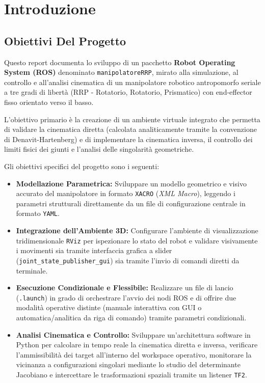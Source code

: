 \documentclass[11pt, a4paper]{report}
\begin{document}
\restoregeometry

\tableofcontents
\cleardoublepage


\chapter{Introduzione}
\section{Obiettivi Del Progetto}
Questo report documenta lo sviluppo di un pacchetto \textbf{Robot Operating System (ROS)} denominato \texttt{manipolatoreRRP}, mirato alla simulazione, al controllo e all'analisi cinematica di un manipolatore robotico antropomorfo seriale a tre gradi di libertà (RRP - Rotatorio, Rotatorio, Prismatico) con end-effector fisso orientato verso il basso.

L'obiettivo primario è la creazione di un ambiente virtuale integrato che permetta di validare la cinematica diretta (calcolata analiticamente tramite la convenzione di Denavit-Hartenberg) e di implementare la cinematica inversa, il controllo dei limiti fisici dei giunti e l'analisi delle singolarità geometriche.

Gli obiettivi specifici del progetto sono i seguenti:
\begin{itemize}
    \item \textbf{Modellazione Parametrica:} Sviluppare un modello geometrico e visivo accurato del manipolatore in formato \texttt{XACRO} (\textit{XML Macro}), leggendo i parametri strutturali direttamente da un file di configurazione centrale in formato \texttt{YAML}.

    \item \textbf{Integrazione dell'Ambiente 3D:} Configurare l'ambiente di visualizzazione tridimensionale \texttt{RViz} per ispezionare lo stato del robot e validare visivamente i movimenti sia tramite interfaccia grafica a slider (\texttt{joint\_state\_publisher\_gui}) sia tramite l'invio di comandi diretti da terminale.

    \item \textbf{Esecuzione Condizionale e Flessibile:} Realizzare un file di lancio (\texttt{.launch}) in grado di orchestrare l'avvio dei nodi ROS e di offrire due modalità operative distinte (manuale interattiva con GUI o automatica/analitica da riga di comando) tramite parametri condizionali.

    \item \textbf{Analisi Cinematica e Controllo:} Sviluppare un'architettura software in Python per calcolare in tempo reale la cinematica diretta e inversa, verificare l'ammissibilità dei target all'interno del workspace operativo, monitorare la vicinanza a configurazioni singolari mediante lo studio del determinante Jacobiano e intercettare le trasformazioni spaziali tramite un listener \texttt{TF2}.
\end{itemize}
\end{document}

